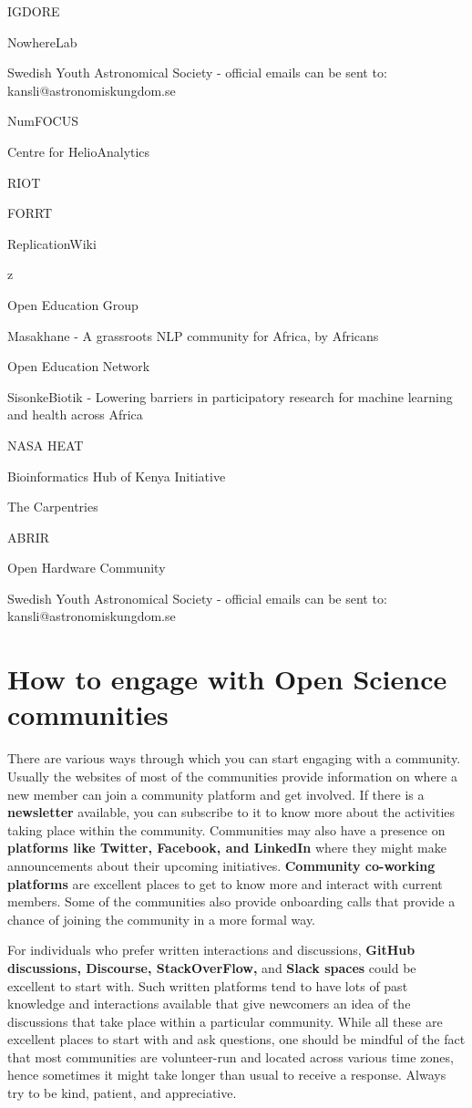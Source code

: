 \documentclass[
  letterpaper,
  DIV=11,
  numbers=noendperiod]{scrreport}
\begin{document}
IGDORE

NowhereLab

Swedish Youth Astronomical Society - official emails can be sent to:
kansli@astronomiskungdom.se

NumFOCUS

Centre for HelioAnalytics

RIOT

FORRT

ReplicationWiki

z

Open Education Group

Masakhane - A grassroots NLP community for Africa, by Africans

Open Education Network

SisonkeBiotik - Lowering barriers in participatory research for machine
learning and health across Africa

NASA HEAT

Bioinformatics Hub of Kenya Initiative

The Carpentries

ABRIR

Open Hardware Community

Swedish Youth Astronomical Society - official emails can be sent to:
kansli@astronomiskungdom.se

\hypertarget{how-to-engage-with-open-science-communities}{%
\section{How to engage with Open Science
communities}\label{how-to-engage-with-open-science-communities}}

There are various ways through which you can start engaging with a
community. Usually the websites of most of the communities provide
information on where a new member can join a community platform and get
involved. If there is a \textbf{newsletter} available, you can subscribe
to it to know more about the activities taking place within the
community. Communities may also have a presence on \textbf{platforms
like Twitter, Facebook, and LinkedIn} where they might make
announcements about their upcoming initiatives. \textbf{Community
co-working platforms} are excellent places to get to know more and
interact with current members. Some of the communities also provide
onboarding calls that provide a chance of joining the community in a
more formal way.

For individuals who prefer written interactions and discussions,
\textbf{GitHub discussions, Discourse, StackOverFlow,} and \textbf{Slack
spaces} could be excellent to start with. Such written platforms tend to
have lots of past knowledge and interactions available that give
newcomers an idea of the discussions that take place within a particular
community. While all these are excellent places to start with and ask
questions, one should be mindful of the fact that most communities are
volunteer-run and located across various time zones, hence sometimes it
might take longer than usual to receive a response. Always try to be
kind, patient, and appreciative.
\end{document}
